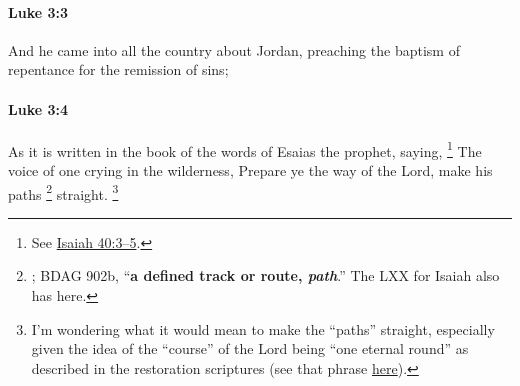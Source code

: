 		\paragraph{Luke 3:3} %
			\label{LUKE-3-3}

			And he came into all the country about Jordan, preaching the baptism of repentance for the remission of sins;

			\begin{framed}
			\scriptsize
				\begin{compactdesc}
					\item[SBLG]  \hyperref[APHESIS]{} 
				\end{compactdesc}
			\end{framed}

		\paragraph{Luke 3:4} %
			\label{LUKE-3-4}

			As it is written in the book of the words of Esaias the prophet, saying,
				\footnote{%
					See \hyperref[ISAIAH-40-3]{Isaiah 40:3--5}.
					}%
			The voice of one crying in the wilderness, Prepare ye the way of the Lord, make his paths%
				\footnote{%
					; BDAG 902b, ``\textbf{a defined track or route, \textit{path}}.'' The LXX for Isaiah also has  here.
					}
			straight.%
				\footnote{%
					I'm wondering what it would mean to make the ``paths'' straight, especially given the idea of the ``course'' of the Lord being ``one eternal round'' as described in the restoration scriptures (see that phrase \hyperref[ROUND-PHRASES]{here}).
					}

